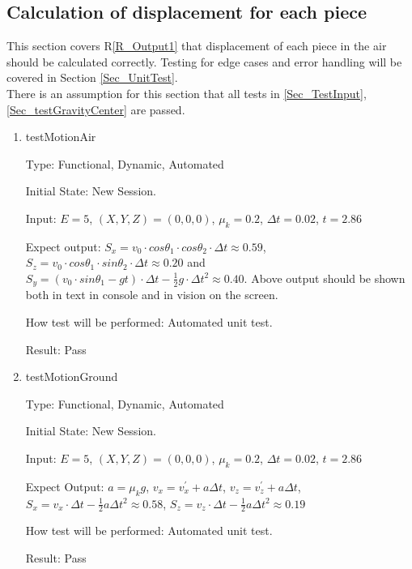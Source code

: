 \documentclass[12pt, titlepage]{article}
\newcommand{\rref}[1]{R\ref{#1}}
\begin{document}
\subsection{Calculation of displacement for each piece}
\label{Sec_TestMotionAir}

This section covers \rref{R_Output1} that displacement of each piece in the air should be calculated correctly. Testing for edge cases and error handling will be covered in Section \ref{Sec_UnitTest}.\\ 
There is an assumption for this section that all tests in \ref{Sec_TestInput}, \ref{Sec_testGravityCenter} are passed.
\begin{enumerate}
	
	\item{testMotionAir\\}
	
	Type: Functional, Dynamic, Automated
	
	Initial State: New Session.
	
	Input: $E = 5$, $(X,Y,Z) = (0,0,0)$, $\mu_{k} = 0.2$, $\Delta t = 0.02$, $t = 2.86$
	
	Expect output: $S_{x}=v_{0}\cdot cos\theta _{1}\cdot cos\theta _{2}\cdot \Delta t \approx 0.59$, $S_{z}=v_{0}\cdot cos\theta _{1}\cdot sin\theta _{2}\cdot \Delta t \approx 0.20$ and $S_{y}=(v_{0}\cdot sin\theta _{1} - gt)\cdot \Delta t-\frac{1}{2}g \cdot \Delta t^{2} \approx 0.40$. Above output should be shown both in text in console and in vision on the screen.
	
	How test will be performed: Automated unit test.
	
	Result: Pass
	
	\item{testMotionGround\\}
	
	Type: Functional, Dynamic, Automated
	
	Initial State: New Session.
	
	Input: $E = 5$, $(X,Y,Z) = (0,0,0)$, $\mu_{k} = 0.2$, $\Delta t = 0.02$, $t = 2.86$
	
	Expect Output: $a=\mu_{k}g$, $v_{x} = v_{x}^{'} + a\Delta t$, $v_{z} = v_{z}^{'} + a\Delta t$, $S_{x}=v_{x}\cdot \Delta t-\frac{1}{2}a\Delta t^{2} \approx 0.58$, $S_{z}=v_{z}\cdot \Delta t-\frac{1}{2}a\Delta t^{2} \approx 0.19$ 
	
	How test will be performed: Automated unit test.
	
	Result: Pass
\end{enumerate}
\end{document}

